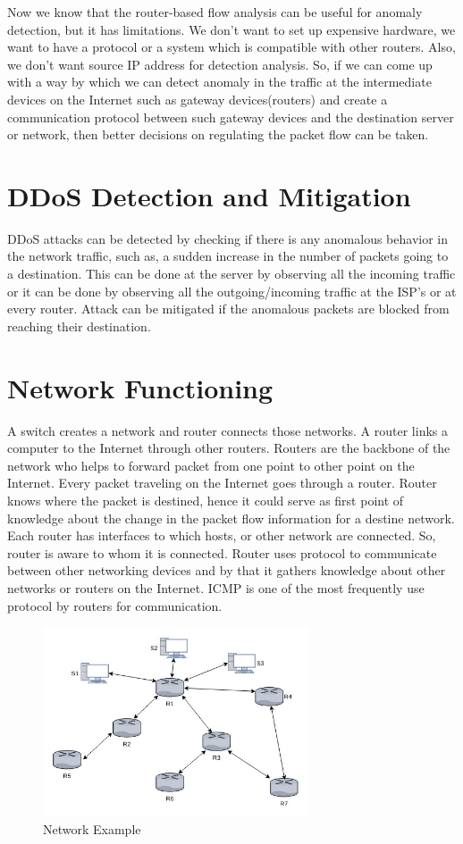 \documentclass[12pt,oneside,a4paper]{article}
\begin{document}
Now we know that the router-based flow analysis can be useful for anomaly detection, but it has limitations. We don't want to set up expensive hardware, we want to have a protocol or a system which is compatible with other routers. Also, we don't want source IP address for detection analysis. So, if we can come up with a way by which we can detect anomaly in the traffic at the intermediate devices on the Internet such as gateway devices(routers) and create a communication protocol between such gateway devices and the destination server or network, then better decisions on regulating the packet flow can be taken.
\pagebreak
\section{DDoS Detection and Mitigation}

DDoS attacks can be detected by checking if there is any anomalous behavior in the network traffic, such as, a sudden increase in the number of packets going to a destination. This can be done at the server by observing all the incoming traffic or it can be done by observing all the outgoing/incoming traffic at the ISP's or at every router. Attack can be mitigated if the anomalous packets are blocked from reaching their destination.
\pagebreak
\section{Network Functioning}

A switch creates a network and router connects those networks. A router links a computer to the Internet through other routers. Routers are the backbone of the network who helps to forward packet from one point to other point on the Internet. Every packet traveling on the Internet goes through a router\cite{router-switch}. Router knows where the packet is destined, hence it could serve as first point of knowledge about the change in the packet flow information for a destine network. Each router has interfaces to which hosts, or other network are connected. So, router is aware to whom it is connected. Router uses protocol to communicate between other networking devices and by that it gathers knowledge about other networks or routers on the Internet. ICMP\cite{icmp} is one of the most frequently use protocol by routers for communication.\par

\begin{figure}[H]
\centering
\includegraphics[width=0.70\textwidth]{routers.jpg}
\caption{Network Example} \label{fig:routers}
\end{figure}
\end{document}
